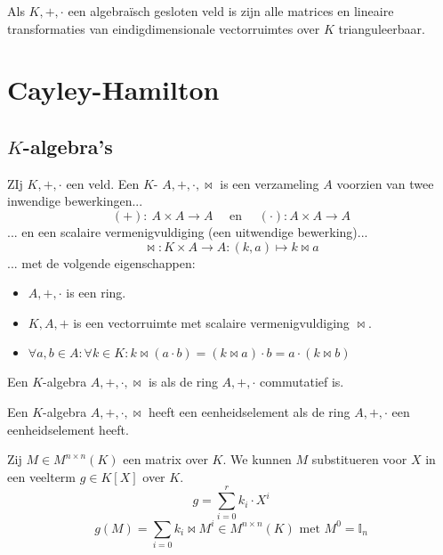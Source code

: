 \documentclass[main.tex]{subfiles}
\begin{document}
\begin{opm}
  Als $K,+,\cdot$ een algebra\"isch gesloten veld is zijn alle matrices en lineaire transformaties van eindigdimensionale vectorruimtes over $K$ trianguleerbaar.
\end{opm}

\section{Cayley-Hamilton}
\label{sec:cayley-hamilton}

\subsection{$K$-algebra's}
\label{sec:k-algebras}

\begin{de}
  ZIj $K,+,\cdot$ een veld.
  Een $K$- $A,+,\cdot,\bowtie$ is een verzameling $A$ voorzien van twee inwendige bewerkingen...
  \[ (+):\ A \times A \rightarrow A \quad\text{ en }\quad (\cdot): A \times A \rightarrow A \]
  ... en een scalaire vermenigvuldiging (een uitwendige bewerking)...
  \[ \bowtie: K \times A \rightarrow A: (k,a) \mapsto k \bowtie a \]
  ... met de volgende eigenschappen:
  \begin{itemize}
  \item $A,+,\cdot$ is een ring.
  \item $K,A,+$ is een vectorruimte met scalaire vermenigvuldiging $\bowtie$.
  \item $\forall a,b \in A: \forall k \in K: k \bowtie (a\cdot b) = (k \bowtie a) \cdot b = a \cdot (k \bowtie b)$
  \end{itemize}
\end{de}

\begin{de}
  Een $K$-algebra $A,+,\cdot,\bowtie$ is  als de ring $A,+,\cdot$ commutatief is.
\end{de}

\begin{de}
  Een $K$-algebra $A,+,\cdot,\bowtie$ heeft een eenheidselement als de ring $A,+,\cdot$ een eenheidselement heeft.
\end{de}

\begin{de}
  Zij $M \in M^{n\times n}(K)$ een matrix over $K$.
  We kunnen $M$ substitueren voor $X$ in een veelterm $g\in K[X]$ over $K$.
  \[ g = \sum_{i=0}^{r}k_{i}\cdot X^{i} \]
  \[ g(M) = \sum_{i=0}k_{i}\bowtie M^{i} \in M^{n\times n}(K)\text{ met } M^{0} = \mathbb{I}_{n} \]
\end{de}
\end{document}
